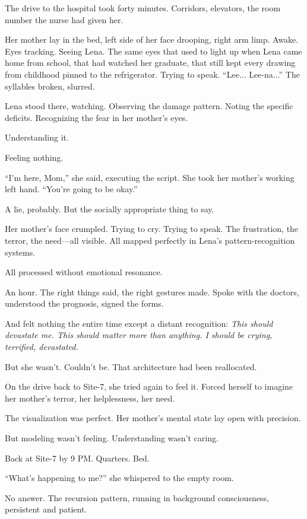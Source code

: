 The drive to the hospital took forty minutes. Corridors, elevators, the room number the nurse had given her.

Her mother lay in the bed, left side of her face drooping, right arm limp. Awake. Eyes tracking. Seeing Lena. The same eyes that used to light up when Lena came home from school, that had watched her graduate, that still kept every drawing from childhood pinned to the refrigerator. Trying to speak. ``Lee... Lee-na...'' The syllables broken, slurred.

Lena stood there, watching. Observing the damage pattern. Noting the specific deficits. Recognizing the fear in her mother's eyes.

Understanding it.

Feeling nothing.

``I'm here, Mom,'' she said, executing the script. She took her mother's working left hand. ``You're going to be okay.''

A lie, probably. But the socially appropriate thing to say.

Her mother's face crumpled. Trying to cry. Trying to speak. The frustration, the terror, the need—all visible. All mapped perfectly in Lena's pattern-recognition systems.

All processed without emotional resonance.

An hour. The right things said, the right gestures made. Spoke with the doctors, understood the prognosis, signed the forms.

And felt nothing the entire time except a distant recognition: \textit{This should devastate me. This should matter more than anything. I should be crying, terrified, devastated.}

But she wasn't. Couldn't be. That architecture had been reallocated.

On the drive back to Site-7, she tried again to feel it. Forced herself to imagine her mother's terror, her helplessness, her need.

The visualization was perfect. Her mother's mental state lay open with precision.

But modeling wasn't feeling. Understanding wasn't caring.

Back at Site-7 by 9 PM. Quarters. Bed.

``What's happening to me?'' she whispered to the empty room.

No answer. The recursion pattern, running in background consciousness, persistent and patient.


